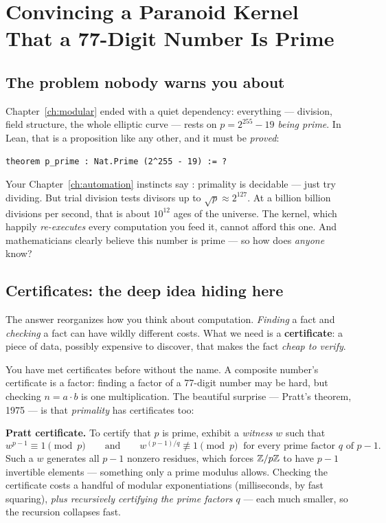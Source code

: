 \chapter{Convincing a Paranoid Kernel That a 77-Digit Number Is Prime}
\label{ch:prime}

\section{The problem nobody warns you about}

Chapter~\ref{ch:modular} ended with a quiet dependency: everything ---
division, field structure, the whole elliptic curve --- rests on
$p = 2^{255}-19$ \emph{being prime}. In Lean, that is a proposition like any
other, and it must be \emph{proved}:

\begin{lstlisting}[language=Lean]
theorem p_prime : Nat.Prime (2^255 - 19) := ?
\end{lstlisting}

Your Chapter~\ref{ch:automation} instincts say : primality is
decidable --- just try dividing. But trial division tests divisors up to
$\sqrt{p} \approx 2^{127}$. At a billion billion divisions per second, that
is about $10^{12}$ ages of the universe. The kernel, which happily
\emph{re-executes} every computation you feed it, cannot afford this one. And
mathematicians clearly believe this number is prime --- so how does
\emph{anyone} know?

\section{Certificates: the deep idea hiding here}

The answer reorganizes how you think about computation. \emph{Finding} a
fact and \emph{checking} a fact can have wildly different costs. What we need
is a \textbf{certificate}: a piece of data, possibly expensive to discover,
that makes the fact \emph{cheap to verify}.

You have met certificates before without the name. A composite number's
certificate is a factor: finding a factor of a 77-digit number may be hard,
but checking $n = a \cdot b$ is one multiplication. The beautiful surprise
--- Pratt's theorem, 1975 --- is that \emph{primality} has certificates too:

\begin{bigidea}
\textbf{Pratt certificate.} To certify that $p$ is prime, exhibit a
\emph{witness} $w$ such that
\[
w^{p-1} \equiv 1 \pmod p
\qquad\text{and}\qquad
w^{(p-1)/q} \not\equiv 1 \pmod p
\ \text{ for every prime factor } q \text{ of } p-1 .
\]
Such a $w$ generates all $p-1$ nonzero residues, which forces $\mathbb{Z}/p\mathbb{Z}$ to
have $p-1$ invertible elements --- something only a prime modulus allows.
Checking the certificate costs a handful of modular exponentiations
(milliseconds, by fast squaring), \emph{plus recursively certifying the
prime factors $q$} --- each much smaller, so the recursion collapses fast.
\end{bigidea}

